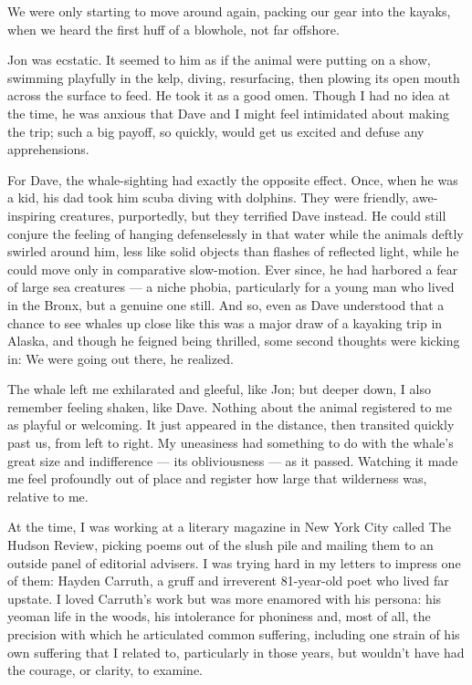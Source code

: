 We were only starting to move around again, packing our gear into the
kayaks, when we heard the first huff of a blowhole, not far offshore.

Jon was ecstatic. It seemed to him as if the animal were putting on a
show, swimming playfully in the kelp, diving, resurfacing, then plowing
its open mouth across the surface to feed. He took it as a good omen.
Though I had no idea at the time, he was anxious that Dave and I might
feel intimidated about making the trip; such a big payoff, so quickly,
would get us excited and defuse any apprehensions.

For Dave, the whale-sighting had exactly the opposite effect. Once, when
he was a kid, his dad took him scuba diving with dolphins. They were
friendly, awe-inspiring creatures, purportedly, but they terrified Dave
instead. He could still conjure the feeling of hanging defenselessly in
that water while the animals deftly swirled around him, less like solid
objects than flashes of reflected light, while he could move only in
comparative slow-motion. Ever since, he had harbored a fear of large sea
creatures --- a niche phobia, particularly for a young man who lived in
the Bronx, but a genuine one still. And so, even as Dave understood that
a chance to see whales up close like this was a major draw of a kayaking
trip in Alaska, and though he feigned being thrilled, some second
thoughts were kicking in: We were going out there, he realized.

The whale left me exhilarated and gleeful, like Jon; but deeper down, I
also remember feeling shaken, like Dave. Nothing about the animal
registered to me as playful or welcoming. It just appeared in the
distance, then transited quickly past us, from left to right. My
uneasiness had something to do with the whale's great size and
indifference --- its obliviousness --- as it passed. Watching it made me
feel profoundly out of place and register how large that wilderness was,
relative to me.

At the time, I was working at a literary magazine in New York City
called The Hudson Review, picking poems out of the slush pile and
mailing them to an outside panel of editorial advisers. I was trying
hard in my letters to impress one of them: Hayden Carruth, a gruff and
irreverent 81-year-old poet who lived far upstate. I loved Carruth's
work but was more enamored with his persona: his yeoman life in the
woods, his intolerance for phoniness and, most of all, the precision
with which he articulated common suffering, including one strain of his
own suffering that I related to, particularly in those years, but
wouldn't have had the courage, or clarity, to examine.

